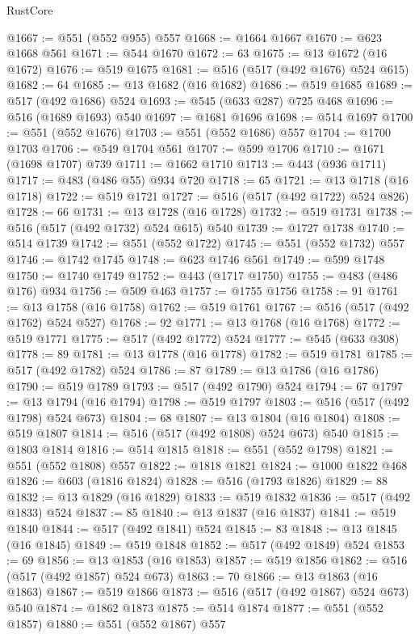 \begin{lexlean}{RustCore}
\begin{coremodule}
@1667 := @551 (@552 @955) @557
@1668 := @1664 @1667
@1670 := @623 @1668 @561
@1671 := @544 @1670
@1672 := 63
@1675 := @13 @1672 (@16 @1672)
@1676 := @519 @1675
@1681 := @516 (@517 (@492 @1676) @524 @615)
@1682 := 64
@1685 := @13 @1682 (@16 @1682)
@1686 := @519 @1685
@1689 := @517 (@492 @1686) @524
@1693 := @545 (@633 @287) @725 @468
@1696 := @516 (@1689 @1693) @540
@1697 := @1681 @1696
@1698 := @514 @1697
@1700 := @551 (@552 @1676)
@1703 := @551 (@552 @1686) @557
@1704 := @1700 @1703
@1706 := @549 @1704 @561
@1707 := @599 @1706
@1710 := @1671 (@1698 @1707) @739
@1711 := @1662 @1710
@1713 := @443 (@936 @1711)
@1717 := @483 (@486 @55) @934 @720
@1718 := 65
@1721 := @13 @1718 (@16 @1718)
@1722 := @519 @1721
@1727 := @516 (@517 (@492 @1722) @524 @826)
@1728 := 66
@1731 := @13 @1728 (@16 @1728)
@1732 := @519 @1731
@1738 := @516 (@517 (@492 @1732) @524 @615) @540
@1739 := @1727 @1738
@1740 := @514 @1739
@1742 := @551 (@552 @1722)
@1745 := @551 (@552 @1732) @557
@1746 := @1742 @1745
@1748 := @623 @1746 @561
@1749 := @599 @1748
@1750 := @1740 @1749
@1752 := @443 (@1717 @1750)
@1755 := @483 (@486 @176) @934
@1756 := @509 @463
@1757 := @1755 @1756
@1758 := 91
@1761 := @13 @1758 (@16 @1758)
@1762 := @519 @1761
@1767 := @516 (@517 (@492 @1762) @524 @527)
@1768 := 92
@1771 := @13 @1768 (@16 @1768)
@1772 := @519 @1771
@1775 := @517 (@492 @1772) @524
@1777 := @545 (@633 @308)
@1778 := 89
@1781 := @13 @1778 (@16 @1778)
@1782 := @519 @1781
@1785 := @517 (@492 @1782) @524
@1786 := 87
@1789 := @13 @1786 (@16 @1786)
@1790 := @519 @1789
@1793 := @517 (@492 @1790) @524
@1794 := 67
@1797 := @13 @1794 (@16 @1794)
@1798 := @519 @1797
@1803 := @516 (@517 (@492 @1798) @524 @673)
@1804 := 68
@1807 := @13 @1804 (@16 @1804)
@1808 := @519 @1807
@1814 := @516 (@517 (@492 @1808) @524 @673) @540
@1815 := @1803 @1814
@1816 := @514 @1815
@1818 := @551 (@552 @1798)
@1821 := @551 (@552 @1808) @557
@1822 := @1818 @1821
@1824 := @1000 @1822 @468
@1826 := @603 (@1816 @1824)
@1828 := @516 (@1793 @1826)
@1829 := 88
@1832 := @13 @1829 (@16 @1829)
@1833 := @519 @1832
@1836 := @517 (@492 @1833) @524
@1837 := 85
@1840 := @13 @1837 (@16 @1837)
@1841 := @519 @1840
@1844 := @517 (@492 @1841) @524
@1845 := 83
@1848 := @13 @1845 (@16 @1845)
@1849 := @519 @1848
@1852 := @517 (@492 @1849) @524
@1853 := 69
@1856 := @13 @1853 (@16 @1853)
@1857 := @519 @1856
@1862 := @516 (@517 (@492 @1857) @524 @673)
@1863 := 70
@1866 := @13 @1863 (@16 @1863)
@1867 := @519 @1866
@1873 := @516 (@517 (@492 @1867) @524 @673) @540
@1874 := @1862 @1873
@1875 := @514 @1874
@1877 := @551 (@552 @1857)
@1880 := @551 (@552 @1867) @557

\end{coremodule}
\end{lexlean}
